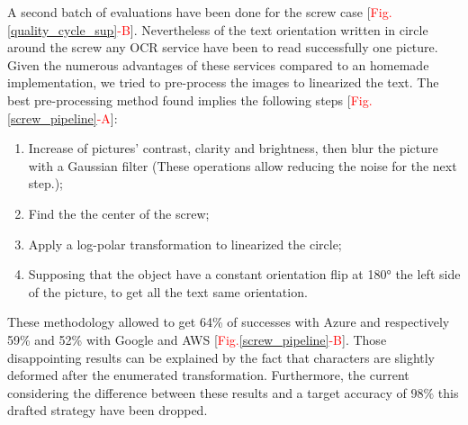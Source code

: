 \documentclass[12pt, french, a4paper]{article} %
\begin{document}
A second batch of evaluations have been done for the screw case [\textcolor{red}{Fig.}\ref{quality_cycle_sup}\textcolor{red}{-B}]. Nevertheless of the text orientation written in circle around the screw any OCR service have been to read successfully one picture. Given the numerous advantages of these services compared to an homemade implementation, we tried to pre-process the images to 
linearized the text. The best pre-processing method found implies the following steps [\textcolor{red}{Fig.}\ref{screw_pipeline}\textcolor{red}{-A}]:
\begin{enumerate}
 \itemsep0em 
 \item Increase of pictures' contrast, clarity and brightness, then blur the picture with a Gaussian filter (These operations allow reducing the noise for the next step.);
 \item Find the the center of the screw;
 \item Apply a log-polar transformation to linearized the circle;
 \item Supposing that the object have a constant orientation flip at 180° the left side of the picture, to get all the text same orientation.
\end{enumerate}
These methodology allowed to get 64\% of successes with Azure and respectively 59\% and 52\% with Google and AWS [\textcolor{red}{Fig.}\ref{screw_pipeline}\textcolor{red}{-B}]. Those disappointing results can be explained by the fact that characters are slightly deformed after the enumerated transformation. Furthermore, the current considering the difference between these results and a target accuracy of $98\%$ this drafted strategy have been dropped. 
\end{document}
